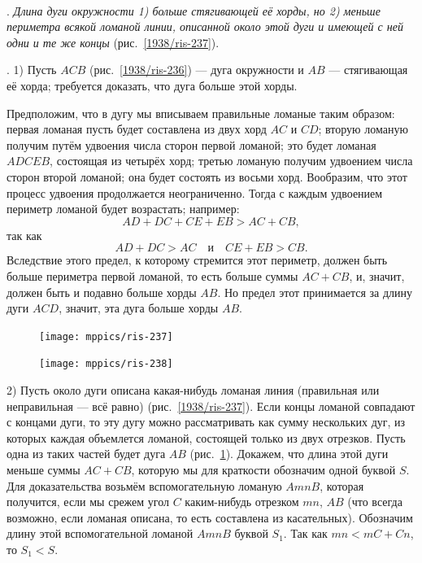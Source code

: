 \documentclass[oneside]{book}
\begin{document}
\paragraph{}\label{1938/235}
.
\emph{Длина дуги окружности
1) больше стягивающей её хорды, но 2) меньше периметра всякой ломаной линии, описанной около этой дуги и имеющей с ней одни и те же концы} (рис.~\ref{1938/ris-237}).

.
1) Пусть $ACB$ (рис.~\ref{1938/ris-236}) — дуга окружности и $AB$ — стягивающая её хорда;
требуется доказать, что дуга больше этой хорды.

Предположим, что в дугу мы вписываем правильные ломаные таким образом:
первая ломаная пусть будет составлена из двух хорд $AC$ и $CD$;
вторую ломаную получим путём удвоения числа сторон первой ломаной;
это будет ломаная $ADCEB$, состоящая из четырёх хорд;
третью ломаную получим удвоением числа сторон второй ломаной;
она будет состоять из восьми хорд.
Вообразим, что этот процесс удвоения продолжается неограниченно.
Тогда с каждым удвоением периметр ломаной будет возрастать;
например:
\[AD+DC+CE+EB>AC+CB,\]
так как
\[AD+DC>AC\quad\text{и}\quad CE+EB>CB.\]
Вследствие этого предел, к которому стремится этот периметр, должен быть больше периметра первой ломаной, то есть больше суммы $AC+CB$, и, значит, должен быть и подавно больше хорды $AB$.
Но предел этот принимается за длину дуги $ACD$, значит, эта дуга больше хорды $AB$.

\begin{figure}
\centering
\texttt{[image: mppics/ris-237]}
\caption{}\label{1938/ris-237}
\bigskip
\texttt{[image: mppics/ris-238]}
\caption{}\label{1938/ris-238}
\end{figure}

2) Пусть около дуги описана какая-нибудь ломаная линия (правильная или неправильная — всё равно) (рис.~\ref{1938/ris-237}).
Если концы ломаной совпадают с концами дуги, то эту дугу можно рассматривать как сумму нескольких дуг, из которых каждая объемлется ломаной, состоящей только из двух отрезков.
Пусть одна из таких частей будет дуга $AB$ (рис.~\ref{1938/ris-238}).
Докажем, что длина этой дуги меньше суммы $AC+CB$, которую мы для краткости обозначим одной буквой $S$.
Для доказательства возьмём вспомогательную ломаную $AmnB$, которая получится, если мы срежем угол $C$ каким-нибудь отрезком $mn$,  $AB$ (что всегда возможно, если ломаная описана, то есть составлена из касательных).
Обозначим длину этой вспомогательной ломаной $AmnB$ буквой $S_1$.
Так как $mn<mC+Cn$, то $S_1<S$.
\end{document}
